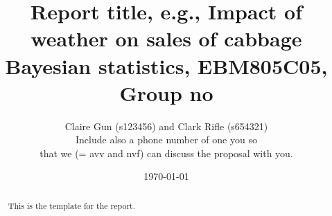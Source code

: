 \documentclass[a4paper,11pt]{article}
\author{Claire Gun (s123456) and Clark Rifle (s654321) \\
  Include also a phone number of one you so\\
  that we (= avv and nvf) can discuss the proposal with you.}
\date{\today}
\title{Report title, e.g., Impact of weather on sales of cabbage\\
  Bayesian statistics, EBM805C05,  Group no}
\theoremstyle{definition}
\numberwithin{equation}{section}
\newcommand{\1}[1]{\,I_{#1}} %
\begin{document}
\maketitle

\begin{abstract}
  This is the template for the report.
\end{abstract}









\appendix



\end{document}
